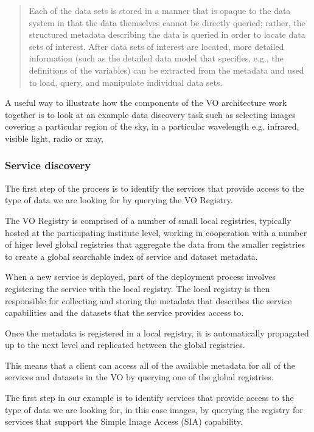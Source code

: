 \documentclass{article}
\begin{document}
\begin{quote}
Each of the data sets is stored in a manner that is opaque to the data system in
that the data themselves cannot be directly queried; rather, the structured
metadata describing the data is queried in order to locate data sets of
interest. After data sets of interest are located, more detailed information
(such as the detailed data model that specifies, e.g., the definitions of the
variables) can be extracted from the metadata and used to load, query, and
manipulate individual data sets.
\end{quote}

A useful way to illustrate how the components of the VO architecture work
together is to look at an example data discovery task such as selecting images
covering a particular region of the sky, in a particular wavelength e.g.
infrared, visible light, radio or xray,

\subsubsection{Service discovery}

The first step of the process is to identify the services that provide access to
the type of data we are looking for by querying the VO Registry.

The VO Registry is comprised of a number of small local registries, typically
hosted at the participating institute level, working in cooperation with
a number of higer level global registries that aggregate the data
from the smaller registries to create a global searchable index of
service and dataset metadata. 

When a new service is deployed, part of the deployment process
involves registering the service with the local registry.
The local registry is then responsible for collecting and storing the
metadata that describes the service capabilities and the datasets
that the service provides access to.

Once the metadata is registered in a local registry, it is automatically
propagated up to the next level and replicated between the global registries.

This means that a client can access all of the available metadata
for all of the services and datasets in the VO by querying one of the 
global registries.

The first step in our example is to identify services that provide access to
the type of data we are looking for, in this case images, by querying the registry
for services that support the Simple Image Access (SIA)
capability.
\end{document}
